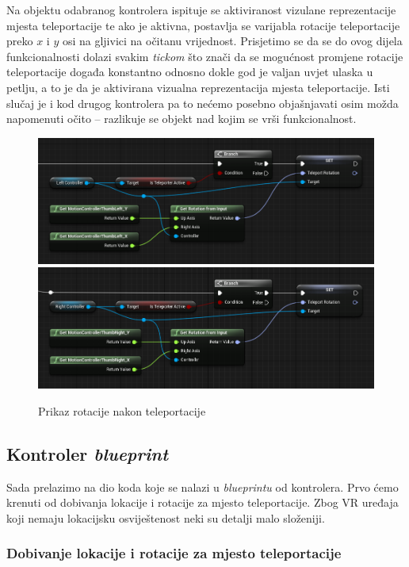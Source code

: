 \documentclass[a4paper,10pt]{article}
\begin{document}
Na objektu odabranog kontrolera ispituje se aktiviranost vizulane
reprezentacije mjesta teleportacije te ako je aktivna, postavlja se varijabla
rotacije teleportacije preko $x$ i $y$ osi na gljivici na očitanu vrijednost.
Prisjetimo se da se do ovog dijela funkcionalnosti dolazi svakim \textit{tickom} što
znači da se mogućnost promjene rotacije teleportacije događa konstantno odnosno
dokle god je valjan uvjet ulaska u petlju, a to je da je aktivirana vizualna
reprezentacija mjesta teleportacije. Isti slučaj je i kod drugog kontrolera pa
to nećemo posebno objašnjavati osim možda napomenuti očito --
razlikuje se objekt nad kojim se vrši funkcionalnost.

\begin{figure}[!h]
	\centering
	\includegraphics[width=\textwidth]{slike/09.png}
	\includegraphics[width=\textwidth]{slike/10.png}
	\caption{Prikaz rotacije nakon teleportacije}
\end{figure}

\subsection{Kontroler \textit{blueprint}}

Sada prelazimo na dio koda koje se nalazi u \textit{blueprintu} od kontrolera. Prvo ćemo
krenuti od dobivanja lokacije i rotacije za mjesto teleportacije. Zbog
VR uređaja koji nemaju lokacijsku osviještenost neki su detalji malo složeniji.

\subsubsection{Dobivanje lokacije i rotacije za mjesto teleportacije}
\end{document}
